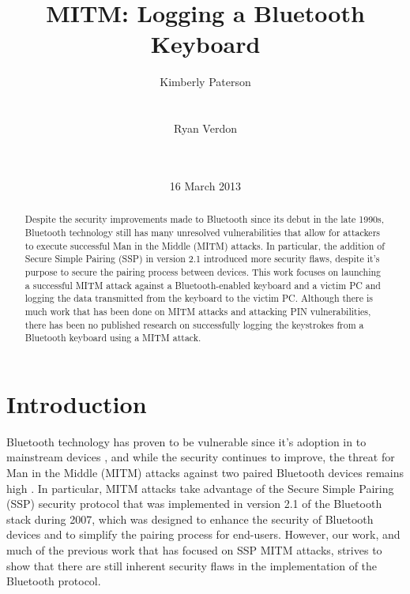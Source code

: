\documentclass{acm_proc_article-sp}
\begin{document}
\title{MITM: Logging a Bluetooth Keyboard}
\author{
\alignauthor Kimberly Paterson\\
\\
\\
\alignauthor Ryan Verdon\\
\\
\\
}

\date{16 March 2013}
\maketitle

\begin{abstract}
Despite the security improvements made to Bluetooth since its debut in the late 1990s, Bluetooth technology still has many unresolved vulnerabilities that allow for attackers to execute successful Man in the Middle (MITM) attacks. In particular, the addition of Secure Simple Pairing (SSP) in version 2.1 introduced more security flaws, despite it's purpose to secure the pairing process between devices. This work focuses on launching a successful MITM attack against a Bluetooth-enabled keyboard and a victim PC and logging the data transmitted from the keyboard to the victim PC. Although there is much work that has been done on MITM attacks and attacking PIN vulnerabilities, there has been no published research on successfully logging the keystrokes from a Bluetooth keyboard using a MITM attack. 
\end{abstract}



\section{Introduction}
Bluetooth technology has proven to be vulnerable since it's adoption in to mainstream devices \cite{scarfone2008guide}, and while the security continues to improve, the threat for Man in the Middle (MITM) attacks against two paired Bluetooth devices remains high \cite{sandhya2012analysis}. In particular, MITM attacks take advantage of the Secure Simple Pairing (SSP) security protocol that was implemented in version 2.1 of the Bluetooth stack during 2007, which was designed to enhance the security of Bluetooth devices and to simplify the pairing process for end-users. However, our work, and much of the previous work that has focused on SSP MITM attacks, strives to show that there are still inherent security flaws in the implementation of the Bluetooth protocol. 
\end{document}
